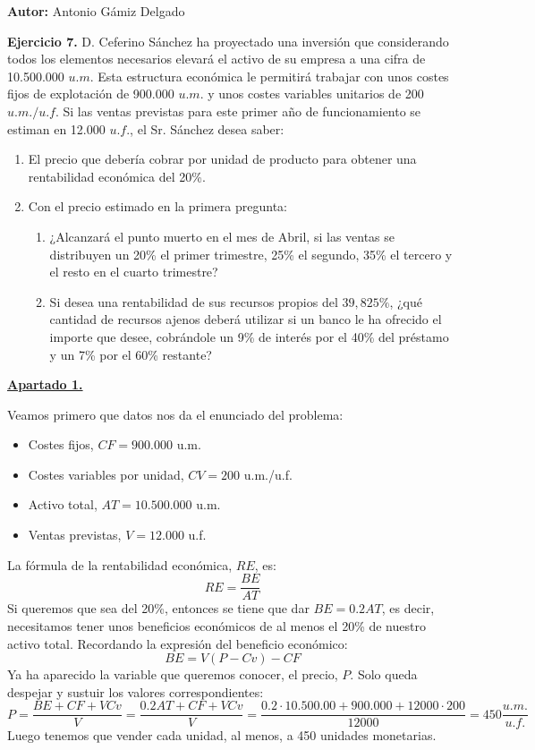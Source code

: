 \documentclass[11pt]{article}
\theoremstyle{definition}
\theoremstyle{remark}
\begin{document}
\textbf{Autor:} Antonio Gámiz Delgado

\medskip

\textbf{Ejercicio 7. }D. Ceferino Sánchez ha proyectado una inversión que considerando todos los elementos necesarios elevará el activo de su empresa a una cifra de 10.500.000 $u.m$. Esta estructura económica le permitirá trabajar con unos costes fijos de explotación de 900.000 $u.m.$ y unos costes variables unitarios de 200 $u.m./u.f.$ Si las ventas previstas para este primer año de funcionamiento se estiman en 12.000 $u.f.$, el Sr. Sánchez desea saber:
\begin{enumerate}
\item El precio que debería cobrar por unidad de producto para obtener una rentabilidad económica del 20\%.
\item Con el precio estimado en la primera pregunta:
\begin{enumerate}
\item ¿Alcanzará el punto muerto en el mes de Abril, si las ventas se distribuyen un 20\% el primer trimestre, 25\% el segundo, 35\% el tercero y el resto en el cuarto trimestre?
\item Si desea una rentabilidad de sus recursos propios del $39,825\%$, ¿qué cantidad de recursos ajenos deberá utilizar si un banco le ha ofrecido el importe que desee, cobrándole un 9\% de interés por el 40\% del préstamo y un 7\% por el 60\% restante?
\end{enumerate}
\end{enumerate}

\underline{\textbf{Apartado 1.}}

Veamos primero que datos nos da el enunciado del problema:
\begin{itemize}
\item Costes fijos, $CF=900.000$ u.m.
\item Costes variables por unidad, $CV=200$ u.m./u.f.
\item Activo total, $AT=10.500.000$ u.m.
\item Ventas previstas, $V=12.000$ u.f.
\end{itemize}

La fórmula de la rentabilidad económica, $RE$, es:
\[
RE=\frac{BE}{AT}
\]
Si queremos que sea del 20\%, entonces se tiene que dar $BE=0.2AT$, es decir, necesitamos tener unos beneficios económicos de al menos el 20\% de nuestro activo total. Recordando la expresión del beneficio económico:
\[
BE=V(P-Cv)-CF
\]
Ya ha aparecido la variable que queremos conocer, el precio, $P$. Solo queda despejar y sustuir los valores correspondientes:
\[
P=\frac{BE+CF+VCv}{V}=\frac{0.2AT+CF+VCv}{V}=\frac{0.2\cdot 10.500.00+900.000+12000\cdot 200}{12000}=450 \frac{u.m.}{u.f.}
\]
Luego tenemos que vender cada unidad, al menos, a 450 unidades monetarias.
\end{document}
